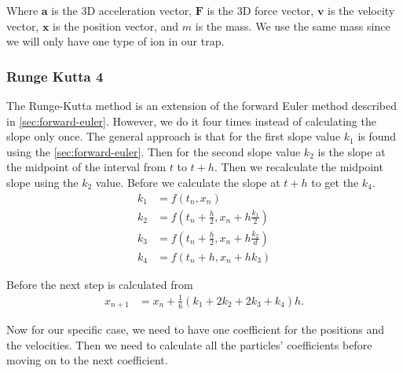 Where $\mathbf{a}$ is the 3D acceleration vector, $\mathbf{F}$ is the 3D force vector,
$\mathbf{v}$ is the velocity vector, $\mathbf{x}$ is the position vector, and $m$ is the mass.
We use the same mass since we will only have one type of ion in our trap.

\subsubsection{Runge Kutta 4}
The Runge-Kutta method is an extension of the forward Euler method described in \ref{sec:forward-euler}.
However, we do it four times instead of calculating the slope only once.
The general approach is that for the first slope value $k_{1}$ is found using the \ref{sec:forward-euler}.
Then for the second slope value $k_{2}$ is the slope at the midpoint of the interval from $t$ to $t + h$.
Then we recalculate the midpoint slope using the $k_{2}$ value.
Before we calculate the slope at $t + h$ to get the $k_{4}$.
\begin{align}
  k_{1} &= f\left(t_{n}, x_{n}\right)\\
  k_{2} &= f\left(t_{n} + \frac{h}{2}, x_{n} + h \frac{k_{1}}{2}\right)\\
  k_{3} &= f\left(t_{n} + \frac{h}{2}, x_{n} + h \frac{k_{2}}{d}\right)\\
  k_{4} &= f\left(t_{n} + h, x_{n} + hk_{3}\right)
\end{align}

Before the next step is calculated from
\begin{align}
  x_{n+1} &= x_{n} + \frac{1}{6}\left(k_{1} + 2k_{2} + 2k_{3} + k_{4}\right)h.
\end{align}

Now for our specific case, we need to have one coefficient for the positions and the velocities.
Then we need to calculate all the particles' coefficients before moving on to the next coefficient.



